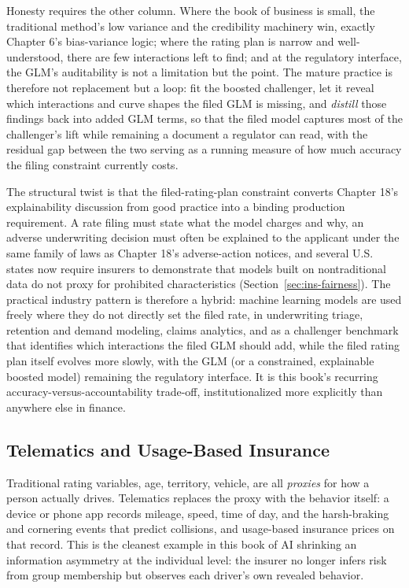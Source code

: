 \documentclass[../ai_in_finance]{subfiles}
\begin{document}
Honesty requires the other column. Where the book of business is small, the traditional method's low variance and the credibility machinery win, exactly Chapter 6's bias-variance logic; where the rating plan is narrow and well-understood, there are few interactions left to find; and at the regulatory interface, the GLM's auditability is not a limitation but the point. The mature practice is therefore not replacement but a loop: fit the boosted challenger, let it reveal which interactions and curve shapes the filed GLM is missing, and \emph{distill} those findings back into added GLM terms, so that the filed model captures most of the challenger's lift while remaining a document a regulator can read, with the residual gap between the two serving as a running measure of how much accuracy the filing constraint currently costs.

The structural twist is that the filed-rating-plan constraint converts Chapter 18's explainability discussion from good practice into a binding production requirement. A rate filing must state what the model charges and why, an adverse underwriting decision must often be explained to the applicant under the same family of laws as Chapter 18's adverse-action notices, and several U.S. states now require insurers to demonstrate that models built on nontraditional data do not proxy for prohibited characteristics (Section~\ref{sec:ins-fairness}). The practical industry pattern is therefore a hybrid: machine learning models are used freely where they do not directly set the filed rate, in underwriting triage, retention and demand modeling, claims analytics, and as a challenger benchmark that identifies which interactions the filed GLM should add, while the filed rating plan itself evolves more slowly, with the GLM (or a constrained, explainable boosted model) remaining the regulatory interface. It is this book's recurring accuracy-versus-accountability trade-off, institutionalized more explicitly than anywhere else in finance.

\subsection{Telematics and Usage-Based Insurance}
\label{sec:ins-telematics}

Traditional rating variables, age, territory, vehicle, are all \emph{proxies} for how a person actually drives. Telematics replaces the proxy with the behavior itself: a device or phone app records mileage, speed, time of day, and the harsh-braking and cornering events that predict collisions, and usage-based insurance prices on that record. This is the cleanest example in this book of AI shrinking an information asymmetry at the individual level: the insurer no longer infers risk from group membership but observes each driver's own revealed behavior.
\end{document}
